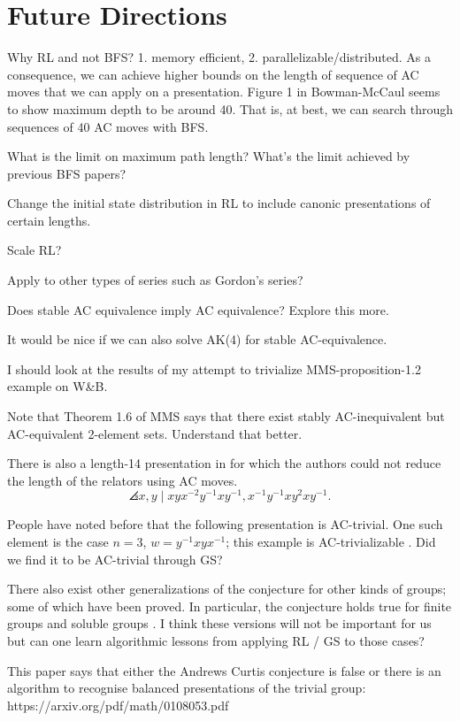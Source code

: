 
\section{Future Directions}

Why RL and not BFS? 1. memory efficient, 2. parallelizable/distributed.
As a consequence,  we can achieve higher bounds on the length of sequence of AC moves that we can apply on a presentation.
Figure 1 in Bowman-McCaul seems to show maximum depth to be around 40.
That is, at best, we can search through sequences of 40 AC moves with BFS.

What is the limit on maximum path length? What's the limit achieved by 
previous BFS papers?

Change the initial state distribution in RL to include canonic presentations of certain lengths.

Scale RL?

Apply to other types of series such as Gordon's series?

Does stable AC equivalence imply AC equivalence? Explore this more.

It would be nice if we can also solve AK(4) for stable AC-equivalence.


I should look at the results of my attempt to trivialize MMS-proposition-1.2 example on W\&B.

Note that Theorem 1.6 of MMS says that there exist stably AC-inequivalent but AC-equivalent 2-element sets. Understand that better.

There is also a length-14 presentation in \cite{MMS} for which the authors could not reduce the length of the relators using AC moves.
\[
\angles{x, y \mid xyx^{-2}y^{-1} xy^{-1}, x^{-1} y^{-1} x y^2 x y^{-1}}.
\]

People have noted before that the following presentation is AC-trivial. One such element is the case $n=3$, $w = y^{-1} x y x^{-1}$; this example is AC-trivializable \cite{morse}. Did we find it to be AC-trivial through GS?

There also exist other generalizations of the conjecture for other kinds of groups; some of which have been proved.
In particular, the conjecture holds true for finite groups and soluble groups \cite{Borovik, Guyot}.
I think these versions will not be important for us but can one learn algorithmic lessons from applying RL / GS to those cases?

 
 This paper says that either the Andrews Curtis conjecture is false or there is an algorithm to recognise balanced presentations of the trivial group: https://arxiv.org/pdf/math/0108053.pdf


